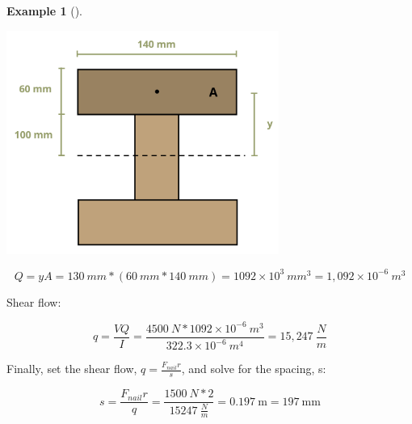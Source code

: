 \documentclass[
  letterpaper,
  DIV=11,
  numbers=noendperiod]{scrreprt}
\theoremstyle{definition}
\newtheorem{example}{Example}[chapter]
\theoremstyle{remark}
\begin{document}
\begin{tcolorbox}
\begin{example}[]
\begin{tcolorbox}
\begin{center}
\includegraphics[width=3.51042in,height=\textheight]{images/CH10 PNGs/example 10.5 part 4.png}
\end{center}

\[
Q=y A=130{~mm} *(60{~mm} * 140{~mm})=1092 \times 10^3{~mm}^3=1,092 \times 10^{-6}{~m}^3
\]

Shear flow:

\[
q=\frac{V Q}{I}=\frac{4500 {~N}* 1092 \times 10^{-6}{~m}^3}{322.3 \times 10^{-6}{~m}^4}=15,247~\frac{N}{m}
\]

Finally, set the shear flow, \(q=\frac{F_{nail} r}{s}\), and solve for
the spacing, s:

\[
s=\frac{F_{nail} r}{q}=\frac{1500{~N} * 2}{15247~\frac{N}{m}}=0.197 \mathrm{~m}=197 \mathrm{~mm}
\]

\end{tcolorbox}

\end{example}

\end{tcolorbox}
\end{document}
